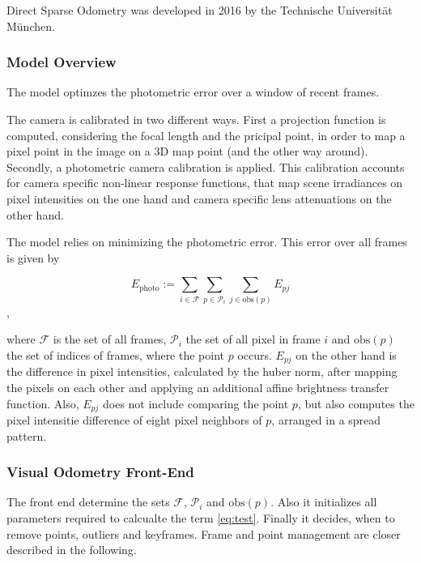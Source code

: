 	Direct Sparse Odometry was developed in 2016 by the Technische Universität München. %
	
	\subsubsection{Model Overview}
	
	The model optimzes the photometric error over a window of recent frames. 
	
	The camera is calibrated in two different ways. First a projection function is computed, considering the focal length and the pricipal point, 
	in order to map a pixel point in the image on a 3D map point (and the other way around). Secondly, a photometric camera calibration is applied. 
	This calibration accounts for camera specific non-linear response functions, that map scene irradiances on pixel intensities on the one hand and 
	camera specific lens attenuations on the other hand. 
	
	The model relies on minimizing the photometric error. This error over all frames is given by
	
	$$E_{\text{photo}}:= \sum_{i \in \mathcal{F}} \sum_{p \in \mathcal{P}_i} \sum_{j \in \text{obs}\left(p\right)} E_{pj}$$,
	
	where $\mathcal{F}$ is the set of all frames, $\mathcal{P}_i$ the set of all pixel in frame $i$ and $\text{obs}\left(p\right)$
	the set of indices of frames, where the point $p$ occurs. $E_{pj}$ on the other hand is the difference in pixel intensities, calculated 
	by the huber norm, after mapping the pixels on each other and applying an additional affine brightness transfer function. Also, $E_{pj}$ does not 
	include comparing the point $p$, but also computes the pixel intensitie difference of eight pixel neighbors of $p$, arranged in a spread pattern. 
	
	
	\subsubsection{Visual Odometry Front-End}
	
	The front end determine the sets $\mathcal{F}$, $\mathcal{P}_i$ and $\text{obs}\left(p\right)$. Also it initializes all parameters required to calcualte the term \ref{eq:test}. 
	Finally it decides, when to remove points, outliers and keyframes. Frame and point management are closer described in the following. 
	
